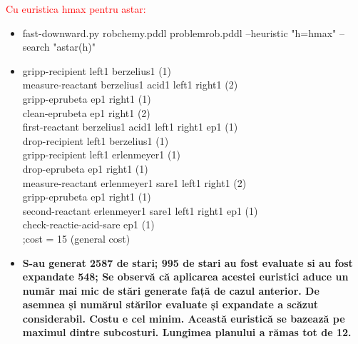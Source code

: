 \textcolor{red}{Cu euristica hmax pentru astar:}
   \begin{itemize}
    \setlength\itemsep{0em}
    \item   fast-downward.py robchemy.pddl problemrob.pddl --heuristic "h=hmax" --search "astar(h)"
    \item gripp-recipient left1 berzelius1 (1)\\
measure-reactant berzelius1 acid1 left1 right1 (2)\\
gripp-eprubeta ep1 right1 (1)\\
clean-eprubeta ep1 right1 (2)\\
first-reactant berzelius1 acid1 left1 right1 ep1 (1)\\
drop-recipient left1 berzelius1 (1)\\
gripp-recipient left1 erlenmeyer1 (1)\\
drop-eprubeta ep1 right1 (1)\\
measure-reactant erlenmeyer1 sare1 left1 right1 (2)\\
gripp-eprubeta ep1 right1 (1)\\
second-reactant erlenmeyer1 sare1 left1 right1 ep1 (1)\\
check-reactie-acid-sare ep1 (1)\\
;cost = 15 (general cost)
    \item \textbf{S-au generat 2587 de stari; 995 de stari au fost evaluate si au fost expandate 548; Se observă că aplicarea acestei euristici aduce un număr mai mic de stări generate față de cazul anterior. De asemnea și numărul stărilor evaluate și expandate a scăzut considerabil. Costu e cel minim. Această euristică se bazează pe maximul dintre subcosturi. Lungimea planului a rămas tot de 12.  }
\end{itemize}


